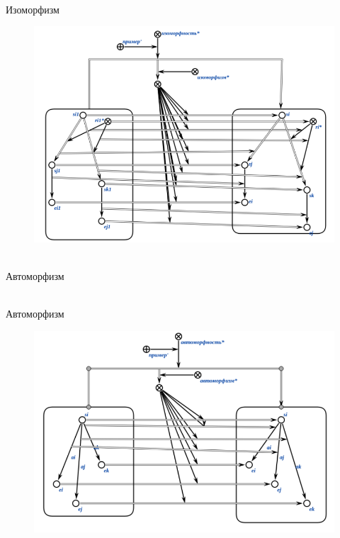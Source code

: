 \begin{frame}{\\Изоморфизм}
    \topline
    \begin{center}
        \begin{figure}[b]
            \centering
            \includegraphics[scale=.5]{figures/sd_correspondences/Isomorphism.png}
        \end{figure}
    \end{center}
\end{frame}

\begin{frame}{\\Автоморфизм}
\topline
\begin{SCn}

\end{SCn}
\end{frame}

\begin{frame}{\\Автоморфизм}
    \topline
    \begin{center}
        \begin{figure}[b]
            \centering
            \includegraphics[scale=.55]{figures/sd_correspondences/Automorphism.png}
        \end{figure}
    \end{center}
\end{frame}